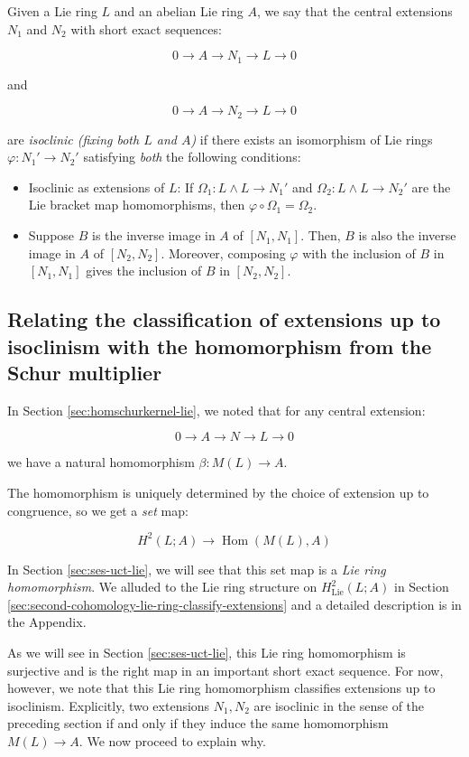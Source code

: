 \documentclass{ucetd}
\begin{document}
Given a Lie ring $L$ and an abelian Lie ring $A$, we say that the central
extensions $N_1$ and $N_2$ with short exact sequences:

$$0 \to A \to N_1 \to L \to 0$$

and

$$0 \to A \to N_2 \to L \to 0$$

are {\em isoclinic (fixing both $L$ and $A$)} if there exists an
isomorphism of Lie rings $\varphi:N_1' \to N_2'$ satisfying {\em both}
the following conditions:

\begin{itemize}
\item Isoclinic as extensions of $L$: If $\Omega_1:L \wedge L \to
  N_1'$ and $\Omega_2:L \wedge L \to N_2'$ are the Lie bracket map
  homomorphisms, then $\varphi \circ \Omega_1 = \Omega_2$.
\item Suppose $B$ is the inverse image in $A$ of $[N_1,N_1]$. Then,
  $B$ is also the inverse image in $A$ of $[N_2,N_2]$. Moreover,
  composing $\varphi$ with the inclusion of $B$ in $[N_1,N_1]$ gives
  the inclusion of $B$ in $[N_2,N_2]$.
\end{itemize}

\subsection{Relating the classification of extensions up to isoclinism with the homomorphism from the Schur multiplier}\label{sec:beta-map-lie}

In Section \ref{sec:homschurkernel-lie}, we noted that for any central extension:

$$0 \to A \to N \to L \to 0$$

we have a natural homomorphism $\beta: M(L) \to A$.

The homomorphism is uniquely determined by the choice of extension up
to congruence, so we get a {\em set} map:

$$H^2(L;A) \to \operatorname{Hom}(M(L),A)$$

In Section \ref{sec:ses-uct-lie}, we will see that this set map is a {\em
  Lie ring homomorphism}. We alluded to the Lie ring structure on
$H^2_{\text{Lie}}(L;A)$ in Section
\ref{sec:second-cohomology-lie-ring-classify-extensions} and a
detailed description is in the Appendix.

As we will see in Section \ref{sec:ses-uct-lie}, this Lie ring homomorphism
is surjective and is the right map in an important short exact
sequence. For now, however, we note that this Lie ring homomorphism
classifies extensions up to isoclinism. Explicitly, two extensions
$N_1,N_2$ are isoclinic in the sense of the preceding section if and
only if they induce the same homomorphism $M(L) \to A$. We now proceed
to explain why.
\end{document}
